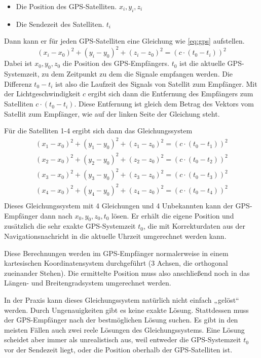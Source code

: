 \documentclass[12pt,a4paper]{scrartcl}
\begin{document}
\begin{itemize}
\item Die Position des GPS-Satelliten. $x_i,y_i,z_i$
\item Die Sendezeit des Satelliten. $t_i$
\end{itemize}

Dann kann er für jeden GPS-Satelliten eine Gleichung wie \eqref{eq:gps} aufstellen.
\begin{equation}
\label{eq:gps}
(x_i - x_0)^2 + (y_i - y_0)^2 + (z_i - z_0)^2 = (c\cdot(t_0-t_i))^2
\end{equation}
Dabei ist $x_0,y_0,z_0$ die Position des GPS-Empfängers. $t_0$ ist die aktuelle GPS-Systemzeit, zu dem Zeitpunkt zu dem die Signale empfangen werden. Die Differenz $t_0-t_i$ ist also die Laufzeit des Signals von Satellit zum Empfänger. Mit der Lichtgeschwindigkeit $c$ ergibt sich dann die Entfernung des Empfängers zum Satelliten $c\cdot (t_0-t_i)$. Diese Entfernung ist gleich dem Betrag des Vektors vom Satellit zum Empfänger, wie auf der linken Seite der Gleichung steht.

Für die Satelliten 1-4 ergibt sich dann das Gleichungssystem
\begin{align*}
(x_1 - x_0)^2 + (y_1 - y_0)^2 + (z_1 - z_0)^2 = (c\cdot(t_0-t_1))^2 \\
(x_2 - x_0)^2 + (y_2 - y_0)^2 + (z_2 - z_0)^2 = (c\cdot(t_0-t_2))^2 \\
(x_3 - x_0)^2 + (y_3 - y_0)^2 + (z_3 - z_0)^2 = (c\cdot(t_0-t_3))^2 \\
(x_4 - x_0)^2 + (y_4 - y_0)^2 + (z_4 - z_0)^2 = (c\cdot(t_0-t_4))^2 \\
\end{align*}
Dieses Gleichungssystem mit 4 Gleichungen und 4 Unbekannten kann der GPS-Empfänger dann nach $x_0,y_0,z_0,t_0$ lösen. Er erhält die eigene Position und zusätzlich die sehr exakte GPS-Systemzeit $t_0$, die mit Korrekturdaten aus der Navigationsnachricht in die aktuelle Uhrzeit umgerechnet werden kann.

Diese Berechnungen werden im GPS-Empfänger normalerweise in einem kartesischen Koordinatensystem durchgeführt (3 Achsen, die orthogonal zueinander Stehen). Die ermittelte Position muss also anschließend noch in das Längen- und Breitengradsystem umgerechnet werden.

In der Praxis kann dieses Gleichungssystem natürlich nicht einfach „gelöst“ werden. Durch Ungenauigkeiten gibt es keine exakte Lösung. Stattdessen muss der GPS-Empfänger nach der bestmöglichen Lösung suchen. Es gibt in den meisten Fällen auch zwei reele Lösungen des Gleichungssystems. Eine Lösung scheidet aber immer als unrealistisch aus, weil entweder die GPS-Systemzeit $t_0$ vor der Sendezeit liegt, oder die Position oberhalb der GPS-Satelliten ist.
\end{document}
